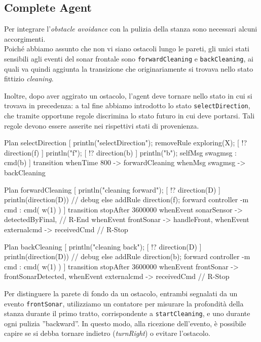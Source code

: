 \documentclass{../llncs}
\newcommand{\codescript}[1]{{\mbox{\small{\texttt{#1}}}}\xspace}
\begin{document}
\subsection{Complete Agent}
Per integrare l'\emph{obstacle avoidance} con la pulizia della stanza sono necessari alcuni accorgimenti.\\

Poiché abbiamo assunto che non vi siano ostacoli lungo le pareti, gli unici stati sensibili agli eventi del sonar frontale sono \codescript{forwardCleaning} e \codescript{backCleaning}, ai quali va quindi aggiunta la transizione che originariamente si trovava nello stato fittizio \emph{cleaning}.

Inoltre, dopo aver aggirato un ostacolo, l'agent deve tornare nello stato in cui si trovava in precedenza: a tal fine abbiamo introdotto lo stato \codescript{selectDirection}, che tramite opportune regole discrimina lo stato futuro in cui deve portarsi. Tali regole devono essere asserite nei rispettivi stati di provenienza.\\

\begin{qacode}[caption={SoftwareAgent, pt10}]
Plan selectDirection [
	println("selectDirection");
	removeRule exploring(X);
	[ !? direction(f) ] println("f");
	[ !? direction(b) ] { println("b"); selfMsg swagmsg : cmd(b) }
]
transition
	whenTime 800 -> forwardCleaning
	whenMsg swagmsg -> backCleaning
	
Plan forwardCleaning [
	println("cleaning forward");
	[ !? direction(D) ]
		println(direction(D)) // debug
	else
		addRule direction(f);
	forward controller -m cmd : cmd( w(1) )
]
transition stopAfter 3600000
	whenEvent sonarSensor -> detectedByFinal, // R-End
	whenEvent frontSonar -> handleFront,
	whenEvent externalcmd -> receivedCmd // R-Stop

Plan backCleaning [
	println("cleaning back");
	[ !? direction(D) ]
		println(direction(D)) // debug
	else
		addRule direction(b);
	forward controller -m cmd : cmd( w(1) )
]
transition stopAfter 3600000
	whenEvent frontSonar -> frontSonarDetected,
	whenEvent externalcmd -> receivedCmd // R-Stop
\end{qacode}

Per distinguere la parete di fondo da un ostacolo, entrambi segnalati da un evento \codescript{frontSonar}, utilizziamo un contatore per misurare la profondità della stanza durante il primo tratto, corrispondente a \codescript{startCleaning}, e uno durante ogni pulizia ''backward''. In questo modo, alla ricezione dell'evento, è possibile capire se si debba tornare indietro (\emph{turnRight}) o evitare l'ostacolo.\\
\end{document}
